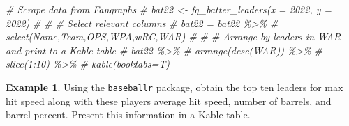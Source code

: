 \documentclass[
  11pt,
]{book}
\newenvironment{Shaded}{\begin{snugshade}}{\end{snugshade}}
\newcommand{\CommentTok}[1]{\textcolor[rgb]{0.56,0.35,0.01}{\textit{#1}}}
\theoremstyle{definition}
\theoremstyle{definition}
\newtheorem{example}{Example}[chapter]
\theoremstyle{definition}
\theoremstyle{definition}
\theoremstyle{remark}
\begin{document}
\begin{Shaded}
\begin{Highlighting}[]
\CommentTok{\# Scrape data from Fangraphs}
\CommentTok{\# bat22 \textless{}{-} fg\_batter\_leaders(x = 2022, y = 2022)}
\CommentTok{\# }
\CommentTok{\# \# Select relevant columns}
\CommentTok{\# bat22 = bat22 \%\textgreater{}\% }
\CommentTok{\#   select(Name,Team,OPS,WPA,wRC,WAR)}
\CommentTok{\# }
\CommentTok{\# \# Arrange by leaders in WAR and print to a Kable table}
\CommentTok{\# bat22 \%\textgreater{}\% }
\CommentTok{\#   arrange(desc(WAR)) \%\textgreater{}\% }
\CommentTok{\#   slice(1:10) \%\textgreater{}\% }
\CommentTok{\#   kable(booktabs=T)}
\end{Highlighting}
\end{Shaded}

\newpage

\begin{example}
Using the \texttt{baseballr} package, obtain the top ten leaders for max hit speed along with these players average hit speed, number of barrels, and barrel percent. Present this information in a Kable table.
\end{example}
\end{document}
